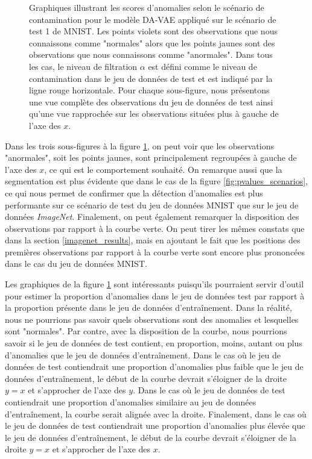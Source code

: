 \begin{figure}[H]
	\caption[Graphiques illustrant les scores d'anomalies selon le scénario de contamination pour le modèle DA-VAE appliqué sur le scénario de test 1 de \textit{MNIST}.]{Graphiques illustrant les scores d'anomalies selon le scénario de contamination pour le modèle DA-VAE appliqué sur le scénario de test 1 de MNIST. Les points violets sont des observations que nous connaissons comme "normales" alors que les points jaunes sont des observations que nous connaissons comme "anormales". Dans tous les cas, le niveau de filtration $\alpha$ est défini comme le niveau de contamination dans le jeu de données de test et est indiqué par la ligne rouge horizontale. Pour chaque sous-figure, nous présentons une vue complète des observations du jeu de données de test ainsi qu'une vue rapprochée sur les observations situées plus à gauche de l'axe des $x$.}
	\label{fig:pvalues_scenarios_mnist}
\end{figure}

Dans les trois sous-figures à la figure \ref{fig:pvalues_scenarios_mnist}, on peut voir que les observations "anormales", soit les points jaunes, sont principalement regroupées à gauche de l'axe des $x$, ce qui est le comportement souhaité. On remarque aussi que la segmentation est plus évidente que dans le cas de la figure \ref{fig:pvalues_scenarios}, ce qui nous permet de confirmer que la détection d'anomalies est plus performante sur ce scénario de test du jeu de données MNIST que sur le jeu de données \textit{ImageNet}. Finalement, on peut également remarquer la disposition des observations par rapport à la courbe verte. On peut tirer les mêmes constats que dans la section \ref{imagenet_results}, mais en ajoutant le fait que les positions des premières observations par rapport à la courbe verte sont encore plus prononcées dans le cas du jeu de données MNIST. 

Les graphiques de la figure \ref{fig:pvalues_scenarios_mnist} sont intéressants puisqu'ils pourraient servir d'outil pour estimer la proportion d'anomalies dans le jeu de données test par rapport à la proportion présente dans le jeu de données d'entraînement. Dans la réalité, nous ne pourrions pas savoir quels observations sont des anomalies et lesquelles sont "normales". Par contre, avec la disposition de la courbe, nous pourrions savoir si le jeu de données de test contient, en proportion, moins, autant ou plus d'anomalies que le jeu de données d'entraînement. Dans le cas où le jeu de données de test contiendrait une proportion d'anomalies plus faible que le jeu de données d'entraînement, le début de la courbe devrait s'éloigner de la droite $y=x$ et s'approcher de l'axe des $y$. Dans le cas où le jeu de données de test contiendrait une proportion d'anomalies similaire au jeu de données d'entraînement, la courbe serait alignée avec la droite. Finalement, dans le cas où le jeu de données de test contiendrait une proportion d'anomalies plus élevée que le jeu de données d'entraînement, le début de la courbe devrait s'éloigner de la droite $y=x$ et s'approcher de l'axe des $x$.


